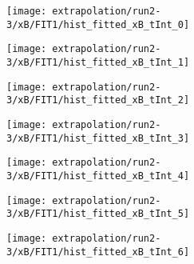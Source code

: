 \begin{figure}
\centering
\caption{Fit to the flask subtracted yield ratio with FIT1 for $x_B$ for run 2-3.}
\label{fig:run2-3_FIT1_xB}
\begin{subfigure}{0.45\linewidth}
\texttt{[image: extrapolation/run2-3/xB/FIT1/hist\_fitted\_xB\_tInt\_0]}
\end{subfigure}
\begin{subfigure}{0.45\linewidth}
\texttt{[image: extrapolation/run2-3/xB/FIT1/hist\_fitted\_xB\_tInt\_1]}
\end{subfigure}
\begin{subfigure}{0.45\linewidth}
\texttt{[image: extrapolation/run2-3/xB/FIT1/hist\_fitted\_xB\_tInt\_2]}
\end{subfigure}
\begin{subfigure}{0.45\linewidth}
\texttt{[image: extrapolation/run2-3/xB/FIT1/hist\_fitted\_xB\_tInt\_3]}
\end{subfigure}
\begin{subfigure}{0.45\linewidth}
\texttt{[image: extrapolation/run2-3/xB/FIT1/hist\_fitted\_xB\_tInt\_4]}
\end{subfigure}
\begin{subfigure}{0.45\linewidth}
\texttt{[image: extrapolation/run2-3/xB/FIT1/hist\_fitted\_xB\_tInt\_5]}
\end{subfigure}
\begin{subfigure}{0.45\linewidth}
\texttt{[image: extrapolation/run2-3/xB/FIT1/hist\_fitted\_xB\_tInt\_6]}
\end{subfigure}
\end{figure}
